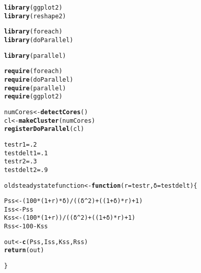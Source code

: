 \documentclass{article}\usepackage[]{graphicx}\usepackage[]{color}
\makeatletter
\newcommand{\hlnum}[1]{\textcolor[rgb]{0.686,0.059,0.569}{#1}}%
\newcommand{\hlopt}[1]{\textcolor[rgb]{0,0,0}{#1}}%
\newcommand{\hlstd}[1]{\textcolor[rgb]{0.345,0.345,0.345}{#1}}%
\newcommand{\hlkwa}[1]{\textcolor[rgb]{0.161,0.373,0.58}{\textbf{#1}}}%
\newcommand{\hlkwb}[1]{\textcolor[rgb]{0.69,0.353,0.396}{#1}}%
\newcommand{\hlkwc}[1]{\textcolor[rgb]{0.333,0.667,0.333}{#1}}%
\newcommand{\hlkwd}[1]{\textcolor[rgb]{0.737,0.353,0.396}{\textbf{#1}}}%
\newenvironment{kframe}{%
 \def\at@end@of@kframe{}%
 \ifinner\ifhmode%
  \def\at@end@of@kframe{\end{minipage}}%
  \begin{minipage}{\columnwidth}%
 \fi\fi%
 \def\FrameCommand##1{\hskip\@totalleftmargin \hskip-\fboxsep
 \colorbox{shadecolor}{##1}\hskip-\fboxsep
     \hskip-\linewidth \hskip-\@totalleftmargin \hskip\columnwidth}%
 \MakeFramed {\advance\hsize-\width
   \@totalleftmargin\z@ \linewidth\hsize
   \@setminipage}}%
 {\par\unskip\endMakeFramed%
 \at@end@of@kframe}
\newenvironment{knitrout}{}{} %
\makeatother
\begin{document}
\begin{knitrout}
\color{fgcolor}\begin{kframe}
\begin{alltt}
\hlkwd{library}\hlstd{(ggplot2)}
\hlkwd{library}\hlstd{(reshape2)}

\hlkwd{library}\hlstd{(foreach)}
\hlkwd{library}\hlstd{(doParallel)}
\end{alltt}


{\ttfamily\noindent\itshape\color{messagecolor}{\#\# Loading required package: iterators\\\#\# Loading required package: parallel}}\begin{alltt}
\hlkwd{library}\hlstd{(parallel)}

\hlkwd{require}\hlstd{(foreach)}
\hlkwd{require}\hlstd{(doParallel)}
\hlkwd{require}\hlstd{(parallel)}
\hlkwd{require}\hlstd{(ggplot2)}

\hlstd{numCores} \hlkwb{<-} \hlkwd{detectCores}\hlstd{()}
\hlstd{cl} \hlkwb{<-} \hlkwd{makeCluster}\hlstd{(numCores)}
\hlkwd{registerDoParallel}\hlstd{(cl)}

\hlstd{testr1} \hlkwb{=} \hlnum{.2}
\hlstd{testdelt1} \hlkwb{=} \hlnum{.1}
\hlstd{testr2} \hlkwb{=} \hlnum{.3}
\hlstd{testdelt2} \hlkwb{=} \hlnum{.9}

\hlstd{oldsteadystatefunction} \hlkwb{<-} \hlkwa{function}\hlstd{(}\hlkwc{r} \hlstd{= testr,}\hlkwc{δ} \hlstd{= testdelt)\{}

\hlstd{Pss} \hlkwb{<-} \hlstd{(}\hlnum{100}\hlopt{*}\hlstd{(}\hlnum{1}\hlopt{+}\hlstd{r)}\hlopt{*}\hlstd{δ)} \hlopt{/} \hlstd{((δ}\hlopt{^}\hlnum{2}\hlstd{)} \hlopt{+} \hlstd{((}\hlnum{1}\hlopt{+}\hlstd{δ)}\hlopt{*}\hlstd{r)} \hlopt{+} \hlnum{1}\hlstd{)}
\hlstd{Iss} \hlkwb{<-} \hlstd{Pss}
\hlstd{Kss} \hlkwb{<-} \hlstd{(}\hlnum{100}\hlopt{*}\hlstd{(}\hlnum{1}\hlopt{+}\hlstd{r))} \hlopt{/} \hlstd{((δ}\hlopt{^}\hlnum{2}\hlstd{)} \hlopt{+} \hlstd{((}\hlnum{1}\hlopt{+}\hlstd{δ)}\hlopt{*}\hlstd{r)} \hlopt{+} \hlnum{1}\hlstd{)}
\hlstd{Rss} \hlkwb{<-} \hlnum{100} \hlopt{-} \hlstd{Kss}

\hlstd{out} \hlkwb{<-} \hlkwd{c}\hlstd{(Pss, Iss, Kss, Rss)}
\hlkwd{return}\hlstd{(out)}

\hlstd{\}}


\end{alltt}
\end{kframe}
\end{knitrout}
\end{document}
